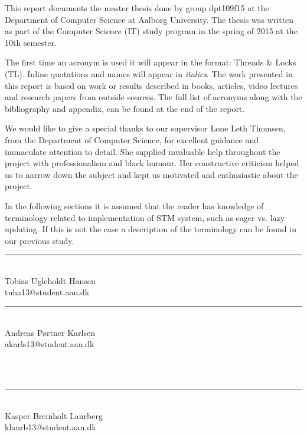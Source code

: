 \makeatletter {}\makeatother
{}
This report documents the master thesis done by group dpt109f15 at the Department of Computer Science at Aalborg University. The thesis was written as part of the Computer Science (IT) study program in the spring of 2015 at the 10th semester.

The first time an acronym is used it will appear in the format: Threads \& Locks (TL). Inline quotations and names will appear in \textit{italics}. The work presented in this report is based on work or results described in books, articles, video lectures and research papers from outside sources. The full list of acronyms along with the bibliography and appendix, can be found at the end of the report.

We would like to give a special thanks to our supervisor Lone Leth Thomsen, from the Department of Computer Science, for excellent guidance and immaculate attention to detail. She supplied invaluable help throughout the project with professionalism and black humour. Her constructive criticism helped us to narrow down the subject and kept us motivated and enthusiastic about the project.

In the following sections it is assumed that the reader has knowledge of terminology related to implementation of \ac{STM} system, such as eager vs. lazy updating. If this is not the case a description of the terminology can be found in our previous study\cite[p. 53]{dpt907e14trending}.

\newpage
\vspace*{30 mm}
\begin{vplace}

\begin{minipage}[b]{0.45\textwidth}
 \centering
 \rule{\textwidth}{0.5pt}\\
  Tobias Ugleholdt Hansen\\
 {\footnotesize tuha13@student.aau.dk}
\end{minipage}
\begin{minipage}[b]{0.45\textwidth}
 \centering
 \rule{\textwidth}{0.5pt}\\
  Andreas Pørtner Karlsen\\
 {\footnotesize akarls13@student.aau.dk}
\end{minipage}\\\\
\begin{minipage}[b]{0.45\textwidth}
 \centering
 \rule{\textwidth}{0.5pt}\\
  Kasper Breinholt Laurberg\\
 {\footnotesize klaurb13@student.aau.dk}
\end{minipage}\\\\


\end{vplace}
\worksheetend
